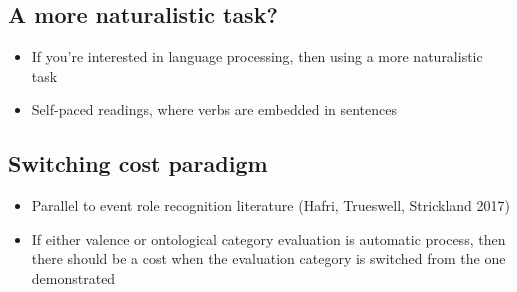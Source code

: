 \documentclass[12pt,letterpaper,table,svgnames,dvipsnames]{article}
\begin{document}
\subsection{A more naturalistic task?}

\begin{itemize}
    \item If you're interested in language processing, then using a more naturalistic task
    \item Self-paced readings, where verbs are embedded in sentences
\end{itemize}

\subsection{Switching cost paradigm}

\begin{itemize}
    \item Parallel to event role recognition literature (Hafri, Trueswell, Strickland 2017)
    \item If either valence or ontological category evaluation is automatic process, then there should be a cost when the evaluation category is switched from the one demonstrated
\end{itemize}

            
 
\end{document}

